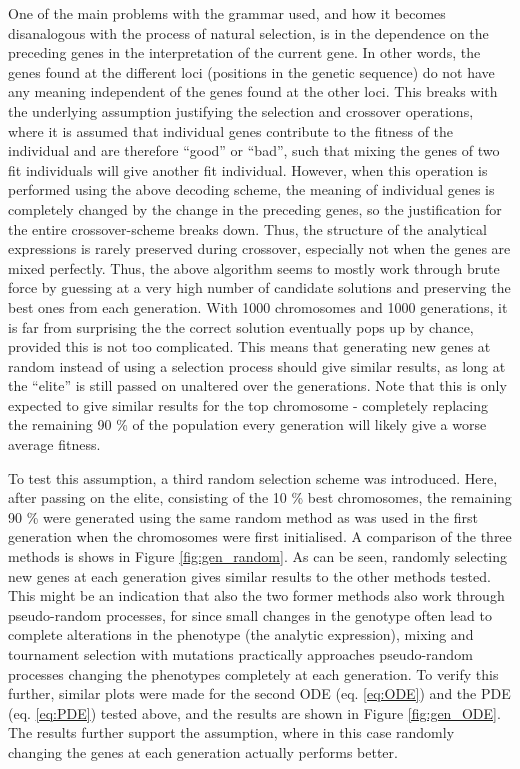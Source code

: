 \documentclass[multicolumn, 12pt]{extarticle}
\begin{document}
One of the main problems with the grammar used, and how it becomes disanalogous with the process of natural selection, is in the dependence on the preceding genes in the interpretation of the current gene. In other words, the genes found at the different loci (positions in the genetic sequence) do not have any meaning independent of the genes found at the other loci. This breaks with the underlying assumption justifying the selection and crossover operations, where it is assumed that individual genes contribute to the fitness of the individual and are therefore ``good'' or ``bad'', such that mixing the genes of two fit individuals will give another fit individual. However, when this operation is performed using the above decoding scheme, the meaning of individual genes is completely changed by the change in the preceding genes, so the justification for the entire crossover-scheme breaks down. Thus, the structure of the analytical expressions is rarely preserved during crossover, especially not when the genes are mixed perfectly. Thus, the above algorithm seems to mostly work through brute force by guessing at a very high number of candidate solutions and preserving the best ones from each generation. With 1000 chromosomes and 1000 generations, it is far from surprising the the correct solution eventually pops up by chance, provided this is not too complicated. This means that generating new genes at random instead of using a selection process should give similar results, as long at the ``elite'' is still passed on unaltered over the generations. Note that this is only expected to give similar results for the top chromosome - completely replacing the remaining 90 \% of the population every generation will likely give a worse average fitness. 

To test this assumption, a third random selection scheme was introduced. Here, after passing on the elite, consisting of the 10 \% best chromosomes, the remaining 90 \% were generated using the same random method as was used in the first generation when the chromosomes were first initialised. A comparison of the three methods is shows in Figure \ref{fig:gen_random}. As can be seen, randomly selecting new genes at each generation gives similar results to the other methods tested. This might be an indication that also the two former methods also work through pseudo-random processes, for since small changes in the genotype often lead to complete alterations in the phenotype (the analytic expression), mixing and tournament selection with mutations practically approaches pseudo-random processes changing the phenotypes completely at each generation. To verify this further, similar plots were made for the second ODE (eq. \eqref{eq:ODE}) and the PDE (eq. \eqref{eq:PDE}) tested above, and the results are shown in Figure \ref{fig:gen_ODE}. The results further support the assumption, where in this case randomly changing the genes at each generation actually performs better. 
\end{document}
